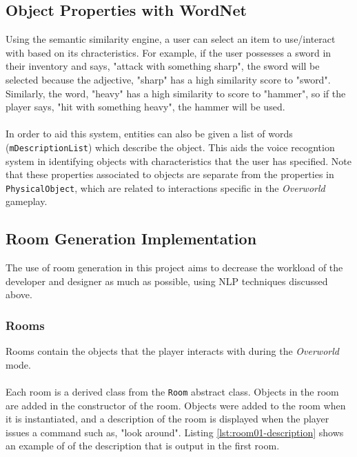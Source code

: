 \documentclass[11pt]{article}
\begin{document}
\subsection{Object Properties with WordNet}

Using the semantic similarity engine, a user can select an item to use/interact with based on its chracteristics. For example, if the user possesses a sword in their inventory and says, "attack with something sharp", the sword will be selected because the adjective, "sharp" has a high similarity score to "sword". Similarly, the word, "heavy" has a high similarity to score to "hammer", so if the player says, "hit with something heavy", the hammer will be used.
\\
\\
In order to aid this system, entities can also be given a list of words (\texttt{mDescriptionList}) which describe the object.  This aids the voice recogntion system in identifying objects with characteristics that the user has specified. Note that these properties associated to objects are separate from the properties in \texttt{PhysicalObject}, which are related to interactions specific in the \textit{Overworld} gameplay.

\label{section:obj-properties-wordnet}

\subsection{Room Generation Implementation}
\label{section:room-generation}

The use of room generation in this project aims to decrease the workload of the developer and designer as much as possible, using NLP techniques discussed above.

\subsubsection{Rooms}
Rooms contain the objects that the player interacts with during the \textit{Overworld} mode.
\\
\\
Each room is a derived class from the \texttt{Room} abstract class. Objects in the room are added in the constructor of the room. Objects were added to the room when it is instantiated, and a description of the room is displayed when the player issues a command such as, "look around". Listing \ref{lst:room01-description} shows an example of of the description that is output in the first room.
\end{document}
